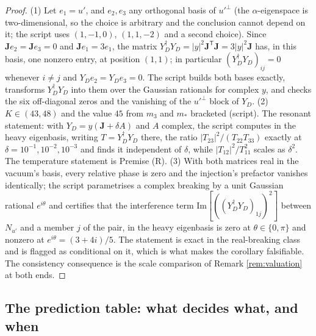 \documentclass[11pt]{article}
\theoremstyle{definition}
\newcommand{\J}{\mathbf{J}}
\begin{document}
\begin{proof}
\sloppy (1) Let $e_{1} = u'$, and $e_{2}, e_{3}$ any orthogonal basis of $u'^{\perp}$ (the $\alpha$-eigenspace is two-dimensional, so the choice is arbitrary and the conclusion cannot depend on it; the script uses $(1, -1, 0)$, $(1, 1, -2)$ and a second choice). Since $\J e_{2} = \J e_{3} = 0$ and $\J e_{1} = 3e_{1}$, the matrix $Y_{D}^{\dagger}Y_{D} = |y|^{2}\J^{\mathsf{T}}\J = 3|y|^{2}\J$ has, in this basis, one nonzero entry, at position $(1,1)$; in particular $(Y_{D}^{\dagger}Y_{D})_{ij} = 0$ whenever $i \neq j$ and $Y_{D}e_{2} = Y_{D}e_{3} = 0$. The script builds both bases exactly, transforms $Y_{D}^{\dagger}Y_{D}$ into them over the Gaussian rationals for complex $y$, and checks the six off-diagonal zeros and the vanishing of the $u'^{\perp}$ block of $Y_{D}$. (2) $K \in (43, 48)$ and the value $45$ from $m_{3}$ and $m_{*}$ bracketed (script). The resonant statement: with $Y_{D} = y(\J + \delta A)$ and $A$ complex, the script computes in the heavy eigenbasis, writing $T = Y_{D}^{\dagger}Y_{D}$ there, the ratio $|T_{23}|^{2}/(T_{22}T_{33})$ exactly at $\delta = 10^{-1}, 10^{-2}, 10^{-3}$ and finds it independent of $\delta$, while $|T_{12}|^{2}/T_{11}^{2}$ scales as $\delta^{2}$. The temperature statement is Premise (R). (3) With both matrices real in the vacuum's basis, every relative phase is zero and the injection's prefactor vanishes identically; the script parametrises a complex breaking by a unit Gaussian rational $e^{i\theta}$ and certifies that the interference term $\mathrm{Im}[((Y_{D}^{\dagger}Y_{D})_{1j})^{2}]$ between $N_{u'}$ and a member $j$ of the pair, in the heavy eigenbasis is zero at $\theta \in \{0, \pi\}$ and nonzero at $e^{i\theta} = (3 + 4i)/5$. The statement is exact in the real-breaking class and is flagged as conditional on it, which is what makes the corollary falsifiable. The consistency consequence is the scale comparison of Remark \ref{rem:valuation} at both ends.
\end{proof}

\subsection*{The prediction table: what decides what, and when}
\end{document}
